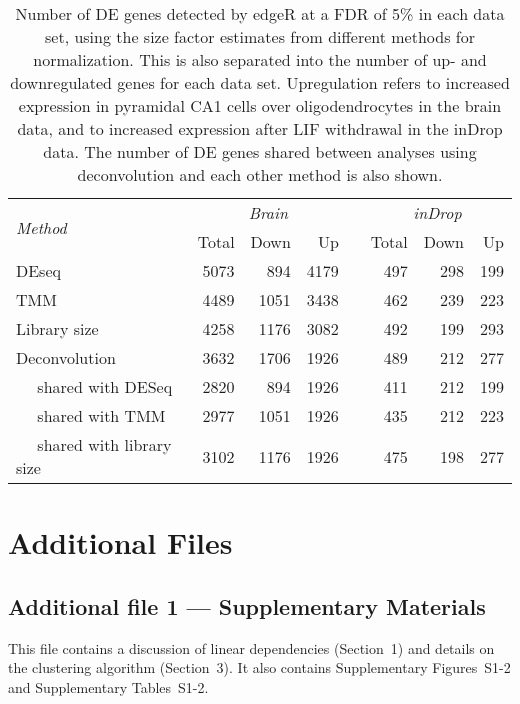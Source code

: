 \documentclass{bmcart}
\newcommand{\supplineardep}{1}
\newcommand{\suppclustering}{3}
\begin{document}
\begin{backmatter}
\begin{table}[!h]
\caption{
    Number of DE genes detected by edgeR at a FDR of 5\% in each data set, using the size factor estimates from different methods for normalization.
    This is also separated into the number of up- and downregulated genes for each data set.
    Upregulation refers to increased expression in pyramidal CA1 cells over oligodendrocytes in the brain data, and to increased expression after LIF withdrawal in the inDrop data.
    The number of DE genes shared between analyses using deconvolution and each other method is also shown.
}
\begin{center}
\begin{tabular}{l r r r c r r r}
\hline
\multirow{2}{*}{\textit{Method}} & \multicolumn{3}{c}{\textit{Brain}} && \multicolumn{3}{c}{\textit{inDrop}}  \\
\cline{2-4}
\cline{6-8}
& Total & Down & Up && Total & Down & Up \\
\hline
DEseq                               & 5073 & 894  & 4179 && 497 & 298 & 199 \\
TMM                                 & 4489 & 1051 & 3438 && 462 & 239 & 223 \\
Library size                        & 4258 & 1176 & 3082 && 492 & 199 & 293 \\
Deconvolution                       & 3632 & 1706 & 1926 && 489 & 212 & 277 \\
$\quad$ shared with DESeq           & 2820 & 894  & 1926 && 411 & 212 & 199 \\
$\quad$ shared with TMM             & 2977 & 1051 & 1926 && 435 & 212 & 223 \\
$\quad$ shared with library size    & 3102 & 1176 & 1926 && 475 & 198 & 277 \\
\hline                                                   
\end{tabular}
\end{center}
\label{tab:real_de}
\end{table}


\section*{Additional Files}
\subsection*{Additional file 1 --- Supplementary Materials}
This file contains a discussion of linear dependencies (Section~\supplineardep{}) 
    and details on the clustering algorithm (Section~\suppclustering{}).
It also contains Supplementary Figures~S1-2 and Supplementary Tables~S1-2.


\end{backmatter}
\end{document}
